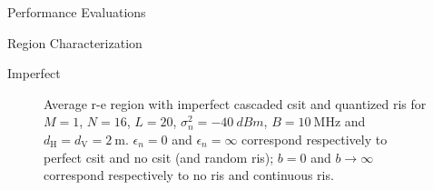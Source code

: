 \begin{section}{Performance Evaluations}
\begin{subsection}{ Region Characterization}
		\begin{subsubsection}{Imperfect }
			\begin{figure}[H]
				\centering
				\caption{Average \gls{r-e} region with imperfect cascaded \gls{csit} and quantized \gls{ris} for $M=1$, $N=16$, $L=20$, $\sigma_n^2=\qty{-40}{dBm}$, $B=\qty{10}{\MHz}$ and $d_{\mathrm{H}}=d_{\mathrm{V}}=\qty{2}{\meter}$. $\epsilon_{n}=0$ and $\epsilon_{n}=\infty$ correspond respectively to perfect \gls{csit} and no \gls{csit} (and random \gls{ris}); $b=0$ and $b \to \infty$ correspond respectively to no \gls{ris} and continuous \gls{ris}.}
			\end{figure}


\end{subsubsection}
\end{subsection}
\end{section}
